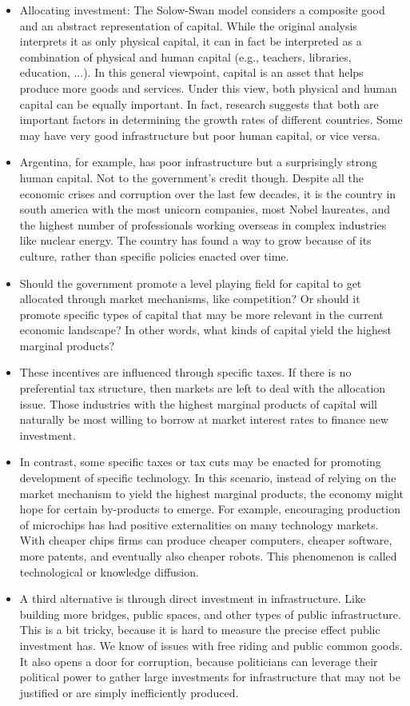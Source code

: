\documentclass[10pt]{article}
\begin{document}
\begin{itemize}
  \item Allocating investment: The Solow-Swan model considers a composite good and an abstract representation of capital. While the original analysis interprets it as only physical capital, it can in fact be interpreted as a combination of physical and human capital (e.g., teachers, libraries, education, ...). In this general viewpoint, capital is an asset that helps produce more goods and services. Under this view, both physical and human capital can be equally important. In fact, research suggests that both are important factors in determining the growth rates of different countries. Some may have very good infrastructure but poor human capital, or vice versa.
  \item Argentina, for example, has poor infrastructure but a surprisingly strong human capital. Not to the government's credit though. Despite all the economic crises and corruption over the last few decades, it is the country in south america with the most unicorn companies, most Nobel laureates, and the highest number of professionals working overseas in complex industries like nuclear energy. The country has found a way to grow because of its culture, rather than specific policies enacted over time.
  \item Should the government promote a level playing field for capital to get allocated through market mechanisms, like competition? Or should it promote specific types of capital that may be more relevant in the current economic landscape? In other words, what kinds of capital yield the highest marginal products?
  \item These incentives are influenced through specific taxes. If there is no preferential tax structure, then markets are left to deal with the allocation issue. Those industries with the highest marginal products of capital will naturally be most willing to borrow at market interest rates to finance new investment.
  \item In contrast, some specific taxes or tax cuts may be enacted for promoting development of specific technology. In this scenario, instead of relying on the market mechanism to yield the highest marginal products, the economy might hope for certain by-products to emerge. For example, encouraging production of microchips has had positive externalities on many technology markets. With cheaper chips firms can produce cheaper computers, cheaper software, more patents, and eventually also cheaper robots. This phenomenon is called technological or knowledge diffusion.
  \item A third alternative is through direct investment in infrastructure. Like building more bridges, public spaces, and other types of public infrastructure. This is a bit tricky, because it is hard to measure the precise effect public investment has. We know of issues with free riding and public common goods. It also opens a door for corruption, because politicians can leverage their political power to gather large investments for infrastructure that may not be justified or are simply inefficiently produced.

\end{itemize}
\end{document}
